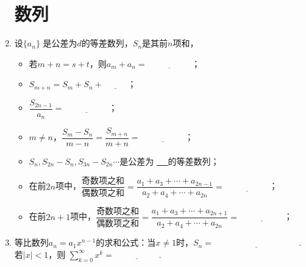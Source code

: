 \documentclass{article}
\newif\ifte
\begin{document}
\begin{multicols}{2}
\begin{enumerate}[leftmargin=20pt]
\section{数列}
\item 设$ \{a_n \} $ 是公差为$ d $的等差数列，$ S_n $是其前$ n $项和，
\begin{itemize}[leftmargin=-4pt]
\item 若$ m+n=s+t $，则$ a_m+a_n=\underline{\ \ifte 
    a_s+a_t\else \hspace{2cm} \fi\ } $；
\item $ S_{m+n}=S_m+S_n+\underline{\ \ifte mnd
    \else \hspace{1cm} \fi\ } $；
\item $ \dfrac{S_{2n-1}}{a_n}=\underline{\ \ifte 2n-1
    \else \hspace{2cm} \fi\ } $；
\item $ m\neq n $，$ \dfrac{S_m-S_n}{m-n}=\dfrac{S_{m+n}}{m+n}=
    \underline{\ \ifte \dfrac{d}{2}(m+n)+(a_1-\dfrac{d}{2})
    \else \hspace{2cm} \fi\ } $；
\item $ S_n,S_{2n}-S_n,S_{3n}-S_{2n} \cdots $是公差为
\underline{\ \ifte $ n^2d $\else \hspace{0.5cm} \fi\ }的等差数列；
\item 在前$ 2n $项中，$ \dfrac{\text{奇数项之和}}{\text{偶数项之和}}=
\dfrac{a_1+a_3+\cdots+a_{2n-1}}{a_2+a_4+\cdots+a_{2n}}=
\underline{\ \ifte \dfrac{a_n}{a_{n+1}} \else \hspace{2cm} \fi\ } $；
\item 在前$ 2n+1 $项中，$ \dfrac{\text{奇数项之和}}{\text{偶数项之和}}=
\dfrac{a_1+a_3+\cdots+a_{2n+1}}{a_2+a_4+\cdots+a_{2n}}=
\underline{\ \ifte \dfrac{n+1}{n} \else \hspace{2cm} \fi\ } $；
\end{itemize}

\item 等比数列$ a_n=a_1x^{n-1} $的求和公式：当$ x\neq 1 $时，$ S_n=
\underline{\ \ifte \dfrac{a_1(1-x^n)}{1-x}=\dfrac{a_1-a_{n+1}}{1-x}
    \else \hspace{4cm} \fi\ } $. 若$ |x|<1 $，则
$ \sum\limits_{k=0}^{\infty} x^{k}=\underline{\ \ifte 
    \dfrac{1}{1-x}\else \hspace{2cm} \fi\ } $.


\end{enumerate}
\end{multicols}
\end{document}
